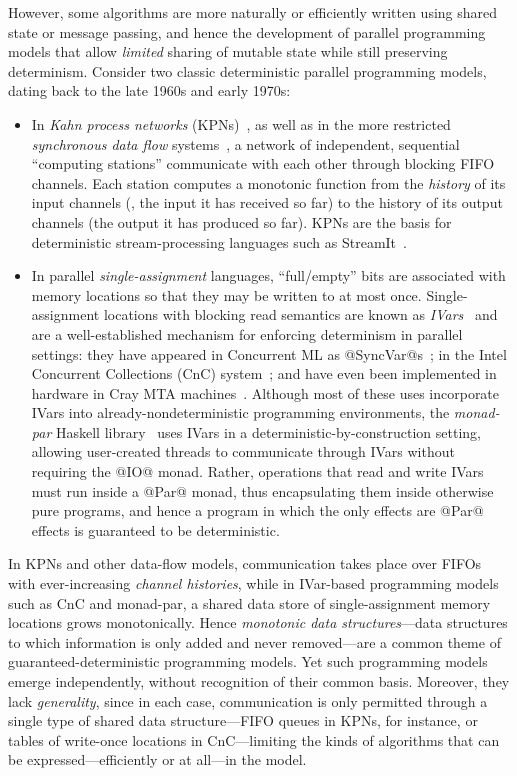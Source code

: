 \documentclass{article}
\begin{document}
However, some algorithms are more naturally or efficiently written
using shared state or message passing, and hence the development of
parallel programming models that allow \emph{limited} sharing of
mutable state while still preserving determinism.  Consider two
classic deterministic parallel programming models, dating back to the
late 1960s and early 1970s:
\begin{itemize}
\item In \emph{Kahn process networks} (KPNs)~\cite{Kahn-1974}, as well
  as in the more restricted \emph{synchronous data flow}
  systems~\cite{lee-sdn}, a network of independent, sequential
  ``computing stations'' communicate with each other through blocking
  FIFO channels.  Each station computes a monotonic function from the
  \emph{history} of its input channels (\ie, the input it has received
  so far) to the history of its output channels (the output it has
  produced so far).  KPNs are the basis for deterministic
  stream-processing languages such as StreamIt~\cite{streamit-asplos}.
\item In parallel \emph{single-assignment} languages, ``full/empty''
  bits are associated with memory locations so that they may be
  written to at most once. Single-assignment locations with blocking
  read semantics are known as \emph{IVars}~\cite{IStructures} and are
  a well-established mechanism for enforcing determinism in parallel
  settings: they have appeared in Concurrent ML as
  @SyncVar@s~\cite{reppy-cml-book}; in the Intel Concurrent
  Collections (CnC) system~\cite{CnC}; and have even been implemented
  in hardware in Cray MTA machines~\cite{cray-mta}.  Although most of
  these uses incorporate IVars into already-nondeterministic
  programming environments, the \emph{monad-par} Haskell
  library~\cite{monad-par} uses IVars in a
  deterministic-by-construction setting, allowing user-created threads
  to communicate through IVars without requiring the @IO@ monad.
  Rather, operations that read and write IVars must run inside a @Par@
  monad, thus encapsulating them inside otherwise pure programs, and
  hence a program in which the only effects are @Par@ effects is
  guaranteed to be deterministic.
\end{itemize}
In KPNs and other data-flow models, communication takes place over
FIFOs with ever-increasing \emph{channel histories}, while in
IVar-based programming models such as CnC and monad-par, a shared data
store of single-assignment memory locations grows monotonically.
Hence \emph{monotonic data structures}---data structures to which
information is only added and never removed---are a common theme of
guaranteed-deterministic programming models.  Yet such programming
models emerge independently, without recognition of their common
basis.  Moreover, they lack \emph{generality}, since in each case,
communication is only permitted through a single type of shared data
structure---FIFO queues in KPNs, for instance, or tables of write-once
locations in CnC---limiting the kinds of algorithms that can be
expressed---efficiently or at all---in the model.
\end{document}

